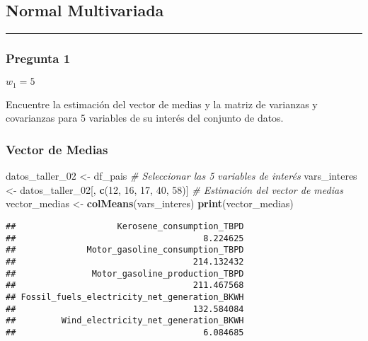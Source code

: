 \documentclass[
]{article}
\newenvironment{Shaded}{\begin{snugshade}}{\end{snugshade}}
\newcommand{\CommentTok}[1]{\textcolor[rgb]{0.56,0.35,0.01}{\textit{#1}}}
\newcommand{\DecValTok}[1]{\textcolor[rgb]{0.00,0.00,0.81}{#1}}
\newcommand{\FunctionTok}[1]{\textcolor[rgb]{0.13,0.29,0.53}{\textbf{#1}}}
\newcommand{\NormalTok}[1]{#1}
\newcommand{\OtherTok}[1]{\textcolor[rgb]{0.56,0.35,0.01}{#1}}
\begin{document}
\subsection{Normal Multivariada}\label{normal-multivariada}

\begin{center}\rule{0.5\linewidth}{0.5pt}\end{center}

\subsubsection{Pregunta 1}\label{pregunta-1}

\(w_1=5\)

Encuentre la estimación del vector de medias y la matriz de varianzas y
covarianzas para 5 variables de su interés del conjunto de datos.

\subsubsection{Vector de Medias}\label{vector-de-medias}

\begin{Shaded}
\begin{Highlighting}[]
\NormalTok{datos\_taller\_02 }\OtherTok{\textless{}{-}}\NormalTok{ df\_pais}
\CommentTok{\# Seleccionar las 5 variables de interés}
\NormalTok{vars\_interes }\OtherTok{\textless{}{-}}\NormalTok{ datos\_taller\_02[, }\FunctionTok{c}\NormalTok{(}\DecValTok{12}\NormalTok{, }\DecValTok{16}\NormalTok{, }\DecValTok{17}\NormalTok{, }\DecValTok{40}\NormalTok{, }\DecValTok{58}\NormalTok{)]}
\CommentTok{\# Estimación del vector de medias}
\NormalTok{vector\_medias }\OtherTok{\textless{}{-}} \FunctionTok{colMeans}\NormalTok{(vars\_interes)}
\FunctionTok{print}\NormalTok{(vector\_medias)}
\end{Highlighting}
\end{Shaded}

\begin{verbatim}
##                    Kerosene_consumption_TBPD 
##                                     8.224625 
##              Motor_gasoline_consumption_TBPD 
##                                   214.132432 
##               Motor_gasoline_production_TBPD 
##                                   211.467568 
## Fossil_fuels_electricity_net_generation_BKWH 
##                                   132.584084 
##         Wind_electricity_net_generation_BKWH 
##                                     6.084685
\end{verbatim}
\end{document}
